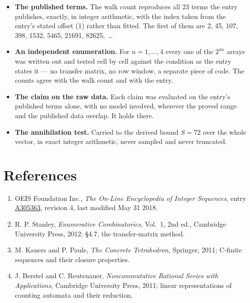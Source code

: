 \documentclass[11pt]{article}
\theoremstyle{definition}
\begin{document}
\begin{itemize}

\item {\bfseries The published terms.} The walk count reproduces all 23 terms the entry publishes, exactly, in integer arithmetic, with the index taken from the entry's stated offset (1) rather than fitted. The first of them are 2, 45, 107, 398, 1532, 5465, 21691, 82625,~\dots

\item {\bfseries An independent enumeration.} For $n = 1,\dots,4$ every one of the $2^{4n}$ arrays was written out and tested cell by cell against the condition as the entry states it --- no transfer matrix, no row window, a separate piece of code. The counts agree with the walk count and with the entry.

\item {\bfseries The claim on the raw data.} Each claim was evaluated on the entry's published terms alone, with no model involved, wherever the proved range and the published data overlap. It holds there.

\item {\bfseries The annihilation test.} Carried to the derived bound $S = 72$ over the whole vector, in exact integer arithmetic, never sampled and never truncated.

\end{itemize}

\section{References}

\begin{enumerate}

\item OEIS Foundation Inc., \emph{The On-Line Encyclopedia of Integer Sequences}, entry \href{https://oeis.org/A305363}{A305363}, revision 4, last modified May 31 2018.

\item R. P. Stanley, \emph{Enumerative Combinatorics}, Vol.~1, 2nd ed., Cambridge University Press, 2012; \S4.7, the transfer-matrix method.

\item M. Kauers and P. Paule, \emph{The Concrete Tetrahedron}, Springer, 2011; C-finite sequences and their closure properties.

\item J. Berstel and C. Reutenauer, \emph{Noncommutative Rational Series with Applications}, Cambridge University Press, 2011; linear representations of counting automata and their reduction.

\end{enumerate}
\end{document}
